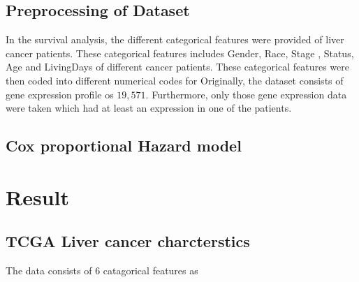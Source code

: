 \documentclass[a4paper,10pt]{article}
\begin{document}
	\subsection {Preprocessing of Dataset}
In the survival analysis, the different categorical features were provided of liver cancer patients. These categorical features includes Gender, Race, Stage , Status, Age and LivingDays of different cancer patients.  These categorical features were then coded into different numerical codes for Originally, the dataset consists of gene expression profile os $19,571$. Furthermore, only those gene expression data were taken which had at least an expression in one of the patients. 

	\subsection{Cox proportional Hazard model}



 \section{Result}
 
 	\subsection {TCGA Liver cancer charcterstics}
 
 The data consists of 6 catagorical features as 
\end{document}
